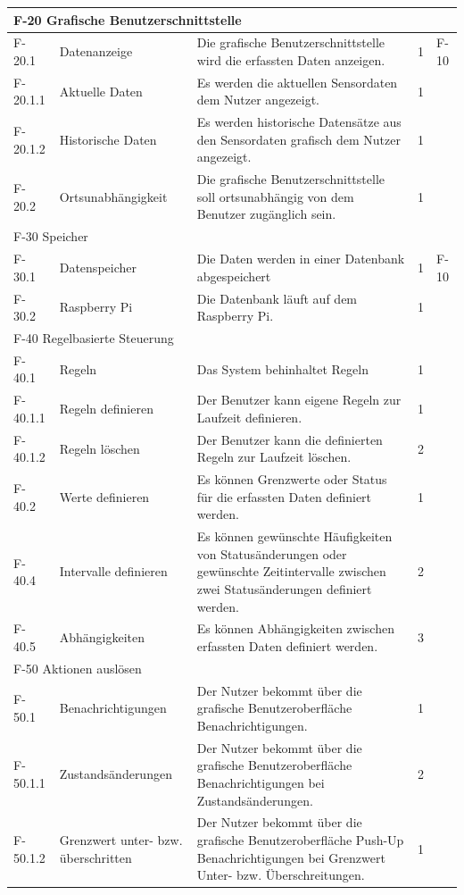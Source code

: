 \begin{tabularx}{\textwidth}{|l|X|X|l|l|}
	\hline
	\multicolumn{5}{|l|}{F-20 Grafische Benutzerschnittstelle}\\
	\hline
	F-20.1   & Datenanzeige & Die grafische Benutzerschnittstelle wird die erfassten Daten anzeigen. & 1 & F-10\\
	F-20.1.1 & Aktuelle Daten & Es werden die aktuellen Sensordaten dem Nutzer angezeigt. & 1 & \\
	F-20.1.2 & Historische Daten & Es werden historische Datensätze aus den Sensordaten grafisch dem Nutzer angezeigt. & 1 & \\
	F-20.2 & Ortsunabhängigkeit & Die grafische Benutzerschnittstelle soll ortsunabhängig von dem Benutzer zugänglich sein. & 1 & \\
	\hline
	\multicolumn{5}{|l|}{F-30 Speicher}\\
	\hline
	F-30.1 & Datenspeicher & Die Daten werden in einer Datenbank abgespeichert & 1 & F-10 \\
	F-30.2 & Raspberry Pi & Die Datenbank läuft auf dem Raspberry Pi. & 1 & \\
	\hline
	\multicolumn{5}{|l|}{F-40 Regelbasierte Steuerung}\\
	\hline
	F-40.1 & Regeln & Das System behinhaltet Regeln & 1 & \\
	F-40.1.1 & Regeln definieren & Der Benutzer kann eigene Regeln zur Laufzeit definieren. & 1 & \\
	F-40.1.2 & Regeln löschen & Der Benutzer kann die definierten Regeln zur Laufzeit löschen. & 2 & \\
	F-40.2 & Werte definieren & Es können Grenzwerte oder Status für die erfassten Daten definiert werden. & 1 & \\
	F-40.4 & Intervalle definieren & Es können gewünschte Häufigkeiten von Statusänderungen oder gewünschte Zeitintervalle zwischen zwei Statusänderungen definiert werden. & 2 & \\
	F-40.5 & Abhängigkeiten & Es können Abhängigkeiten zwischen erfassten Daten definiert werden. & 3 & \\
	\hline
	\multicolumn{5}{|l|}{F-50 Aktionen auslösen}\\
	\hline
	F-50.1 & Benachrichtigungen & Der Nutzer bekommt über die grafische Benutzeroberfläche Benachrichtigungen. & 1 & \\
	F-50.1.1 & Zustandsänderungen & Der Nutzer bekommt über die grafische Benutzeroberfläche Benachrichtigungen bei Zustandsänderungen. & 2 & \\
	F-50.1.2 & Grenzwert unter- bzw. überschritten & Der Nutzer bekommt über die grafische Benutzeroberfläche Push-Up Benachrichtigungen bei Grenzwert Unter- bzw. Überschreitungen. & 1 & \\

\end{tabularx}

